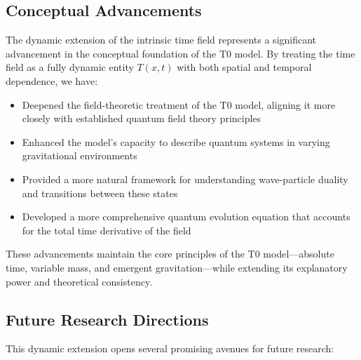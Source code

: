 \documentclass[12pt,a4paper]{article}
\newcommand{\Tfieldt}{T(x,t)}
\begin{document}
	\subsection{Conceptual Advancements}
	\label{subsec:advancements}
	
	The dynamic extension of the intrinsic time field represents a significant advancement in the conceptual foundation of the T0 model. By treating the time field as a fully dynamic entity $\Tfieldt$ with both spatial and temporal dependence, we have:
	
	\begin{itemize}
		\item Deepened the field-theoretic treatment of the T0 model, aligning it more closely with established quantum field theory principles
		\item Enhanced the model's capacity to describe quantum systems in varying gravitational environments
		\item Provided a more natural framework for understanding wave-particle duality and transitions between these states
		\item Developed a more comprehensive quantum evolution equation that accounts for the total time derivative of the field
	\end{itemize}
	
	These advancements maintain the core principles of the T0 model—absolute time, variable mass, and emergent gravitation—while extending its explanatory power and theoretical consistency.
	
	\subsection{Future Research Directions}
	\label{subsec:future_research}
	
	This dynamic extension opens several promising avenues for future research:
	
\end{document}
